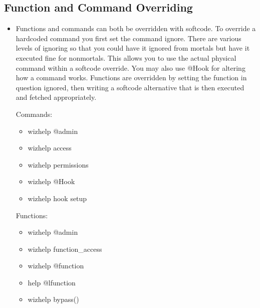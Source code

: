 \documentclass[letterpaper,10pt,english]{sphinxmanual}
\begin{document}
\subsection{Function and Command Overriding}
\label{\detokenize{features:function-and-command-overriding}}\begin{itemize}
\item {} 
\sphinxAtStartPar
Functions and commands can both be overridden with softcode.  To
override a hardcoded command you first set the command ignore.
There are various levels of ignoring so that you could have it
ignored from mortals but have it executed fine for non\sphinxhyphen{}mortals.
This allows you to use the actual physical command within a
softcode override.  You may also use @Hook for altering how
a command works.   Functions are overridden by setting the
function in question ignored, then writing a softcode alternative
that is then executed and fetched appropriately.

\sphinxAtStartPar
Commands:
\begin{itemize}
\item {} 
\sphinxAtStartPar
wizhelp @admin

\item {} 
\sphinxAtStartPar
wizhelp access

\item {} 
\sphinxAtStartPar
wizhelp permissions

\item {} 
\sphinxAtStartPar
wizhelp @Hook

\item {} 
\sphinxAtStartPar
wizhelp hook setup

\end{itemize}

\sphinxAtStartPar
Functions:
\begin{itemize}
\item {} 
\sphinxAtStartPar
wizhelp @admin

\item {} 
\sphinxAtStartPar
wizhelp function\_access

\item {} 
\sphinxAtStartPar
wizhelp @function

\item {} 
\sphinxAtStartPar
help @lfunction

\item {} 
\sphinxAtStartPar
wizhelp bypass()

\end{itemize}

\end{itemize}
\end{document}
